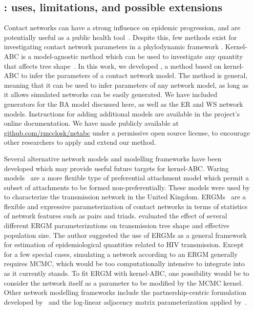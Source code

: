 \subsection{: uses, limitations, and possible extensions}

Contact networks can have a strong influence on epidemic progression, and are
potentially useful as a public health tool~\autocite{wang2015targeting,
little2014using}. Despite this, few methods exist for investigating contact
network parameters in a phylodynamic framework \autocite[although see][for
related work]{groendyke2011bayesian, volz2008sir, brown2011transmission,
leventhal2012inferring, greenbaum2016inference}. Kernel-ABC is a model-agnostic
method which can be used to investigate any quantity that affects tree
shape~\autocite{poon2015phylodynamic}. In this work, we developed
, a method based on kernel-ABC to infer the parameters of a
contact network model. The method is general, meaning that it can be used to
infer parameters of any network model, as long as it allows simulated networks
can be easily generated. We have included generators for the \gls{BA} model
discussed here, as well as the \gls{ER} and \gls{WS} network models.
Instructions for adding additional models are available in the project's online
documentation. We have made  publicly available at
\url{github.com/rmcclosk/netabc} under a permissive open source license, to
encourage other researchers to apply and extend our method.

Several alternative network models and modelling frameworks have been developed
which may provide useful future targets for kernel-\gls{ABC}. Waring
models~\autocite{irwin1963place,handcock2004likelihood} are a more flexible
type of preferential attachment model which permit a subset of attachments to
be formed non-preferentially. These models were used by
\textcite{brown2011transmission} to characterize the transmission network in
the United Kingdom. \Glspl{ERGM}~\autocite{robins2007introduction} are a
flexible and expressive parameterization of contact networks in terms of
statistics of network features such as pairs and triads.
\textcite{goodreau2006assessing} evaluated the effect of several different
\gls{ERGM} parameterizations on transmission tree shape and effective
population size. The author suggested the use of \glspl{ERGM} as a general
framework for estimation of epidemiological quantities related to \gls{HIV}
transmission. Except for a few special cases, simulating a network according to
an \gls{ERGM} generally requires \gls{MCMC}, which would be too computationally
intensive to integrate into  as it currently stands. To fit
\gls{ERGM} with kernel-\gls{ABC}, one possibility would be to consider the
network itself as a parameter to be modified by the \gls{MCMC} kernel.
Other network modelling frameworks include the partnership-centric formulation
developed by~\textcite{eames2002modeling} and the log-linear adjacency matrix
parameterization applied by~\textcite{morris1993epidemiology}.

